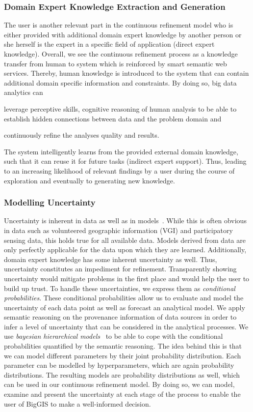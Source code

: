 \documentclass{sig-alternate-05-2015}
\begin{document}
\subsubsection{Domain Expert Knowledge Extraction and Generation}
The user is another relevant part in the continuous refinement model who is
either provided with additional domain expert knowledge by another person or
she herself is the expert in a specific field of application (direct expert
knowledge). Overall, we see the continuous refinement process as a knowledge
transfer from human to system which is reinforced by smart semantic web
services. Thereby, human knowledge is introduced to the system that can contain
additional domain specific information and constraints. By doing so, big data
analytics can
\begin{inparaenum}[(1)]
 	\item leverage perceptive skills, cognitive reasoning of human analysis
to be able to establish hidden connections between data and the problem domain
and
	\item continuously refine the analyses quality and results.
\end{inparaenum}
The system intelligently learns from the provided external domain knowledge,
such that it can reuse it for future tasks (indirect expert support). Thus,
leading to an increasing likelihood of relevant findings by a user during the
course of exploration and eventually to generating new knowledge.


\subsubsection{Modelling Uncertainty}
Uncertainty is inherent in data as well as in
models~\cite{cressie2015statistics}. While this is often obvious in data such
as volunteered geographic information (VGI) and participatory sensing data,
this holds true for all available data. Models derived from data
are only perfectly applicable for the data upon which they are learned.
Additionally, domain expert knowledge has some inherent uncertainty as well.
Thus, uncertainty constitutes an impediment for refinement. Transparently
showing uncertainty would mitigate problems in the first place and would help
the user to build up trust. To handle these uncertainties, we express them as
\textit{conditional probabilities}. These conditional probabilities allow us to
evaluate and model the uncertainty of each data point as well as forecast an
analytical model. We apply semantic reasoning on the provenance information of
data sources in order to infer a level of uncertainty that can be considered in
the analytical processes. We use \textit{bayesian hierarchical
models}~\cite{cressie2015statistics} to be able to cope with the conditional
probabilities quantified by the semantic reasoning. The idea behind this is
that we can model different parameters by their joint probability distribution.
Each parameter can be modelled by hyperparameters, which are again probability
distributions. The resulting models are probability distributions as well,
which can be used in our continuous refinement model. By doing so, we can
model, examine and present the uncertainty at each stage of the process to
enable the user of BigGIS to make a well-informed decision.
\end{document}

